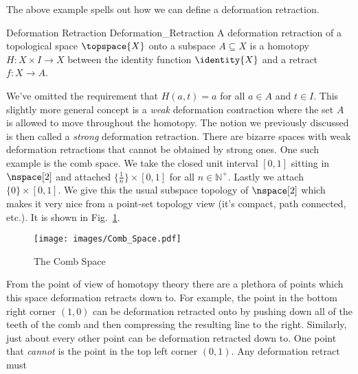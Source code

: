 \documentclass{book}                                                           %
\begin{document}
                The above example spells out how we can define a deformation
                retraction.
                \begin{fdefinition}{Deformation Retraction}
                                   {Deformation_Retraction}
                    A deformation retraction of a topological space
                    $\topspace{X}$ onto a subspace $A\subseteq{X}$ is a
                    homotopy $H:X\times{I}\rightarrow{X}$ between the identity
                    function $\identity{X}$ and a retract $f:X\rightarrow{A}$.
                \end{fdefinition}
                We've omitted the requirement that $H(a,t)=a$ for all $a\in{A}$
                and $t\in{I}$. This slightly more general concept is a
                \textit{weak} deformation contraction where the set $A$ is
                allowed to move throughout the homotopy. The notion we
                previously discussed is then called a \textit{strong}
                deformation retraction. There are bizarre spaces with weak
                deformation retractions that cannot be obtained by strong ones.
                One such example is the comb space. We take the closed unit
                interval $[0,1]$ sitting in $\nspace[2]$ and attached
                $\{\frac{1}{n}\}\times[0,1]$ for all $n\in\mathbb{N}^{+}$.
                Lastly we attach $\{0\}\times[0,1]$. We give this the usual
                subspace topology of $\nspace[2]$ which makes it very nice from
                a point-set topology view (it's compact, path connected, etc.).
                It is shown in Fig.~\ref{fig:Comb_Space}.
                \begin{figure}[H]
                    \centering
                    \captionsetup{type=figure}
                    \texttt{[image: images/Comb\_Space.pdf]}
                    \caption{The Comb Space}
                    \label{fig:Comb_Space}
                \end{figure}
                From the point of view of homotopy theory there are a plethora
                of points which this space deformation retracts down to. For
                example, the point in the bottom right corner $(1,0)$ can be
                deformation retracted onto by pushing down all of the teeth of
                the comb and then compressing the resulting line to the right.
                Similarly, just about every other point can be deformation
                retracted down to. One point that \textit{cannot} is the point
                in the top left corner $(0,1)$. Any deformation retract must
\end{document}
